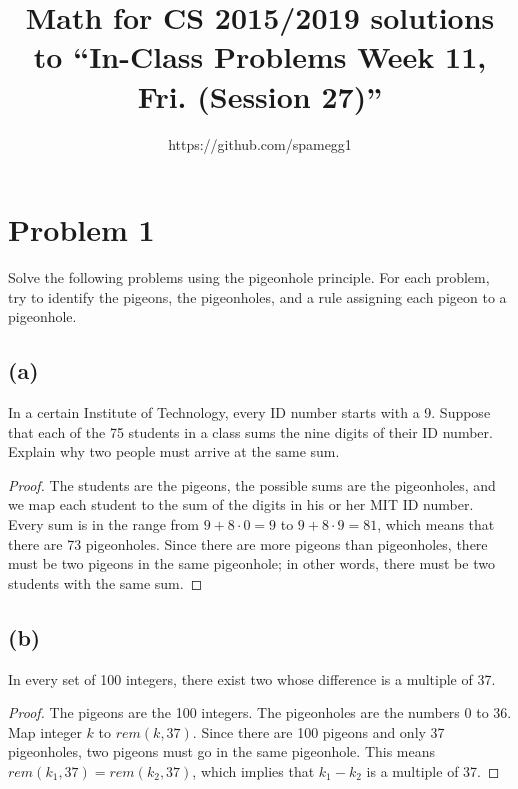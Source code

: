 \documentclass[14pt]{extarticle}
\title{Math for CS 2015/2019 solutions to ``In-Class Problems Week 11, Fri. (Session 27)''}
\author{https://github.com/spamegg1}
\begin{document}
\maketitle
\tableofcontents

\section{Problem 1}
Solve the following problems using the pigeonhole principle. For each problem, try to identify the pigeons, the pigeonholes, and a rule assigning each pigeon to a pigeonhole.

\subsection{(a)}
In a certain Institute of Technology, every ID number starts with a 9. Suppose that each of the 75 students in a class sums the nine digits of their ID number. Explain why two people must arrive at the same sum.
\begin{proof}
The students are the pigeons, the possible sums are the pigeonholes, and we map each student to the sum of the digits in his or her MIT ID number. Every sum is in the range from $9 + 8 \cdot 0 = 9$ to $9 + 8 \cdot 9 = 81$, which means that there are 73 pigeonholes. Since there are more pigeons than pigeonholes, there must be two pigeons in the same pigeonhole; in other words, there must be two students with the same sum.
\end{proof}

\subsection{(b)}
In every set of 100 integers, there exist two whose difference is a multiple of 37.
\begin{proof}
The pigeons are the 100 integers. The pigeonholes are the numbers 0 to 36. Map integer $k$ to $rem(k, 37)$. Since there are 100 pigeons and only 37 pigeonholes, two pigeons must go in the same pigeonhole. This means $rem(k_1 , 37) = rem(k_2 , 37)$, which implies that $k_1 - k_2$ is a multiple of 37.
\end{proof}
\end{document}
